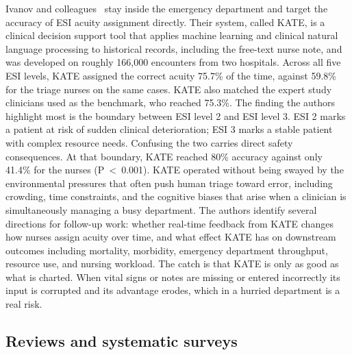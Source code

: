 \documentclass[11pt]{article}
\begin{document}
Ivanov and colleagues~\cite{Ivanov2021} stay inside the emergency department and target the accuracy of ESI acuity assignment directly. Their system, called KATE, is a clinical decision support tool that applies machine learning and clinical natural language processing to historical records, including the free-text nurse note, and was developed on roughly 166{,}000 encounters from two hospitals. Across all five ESI levels, KATE assigned the correct acuity 75.7\% of the time, against 59.8\% for the triage nurses on the same cases. KATE also matched the expert study clinicians used as the benchmark, who reached 75.3\%. The finding the authors highlight most is the boundary between ESI level 2 and ESI level 3. ESI 2 marks a patient at risk of sudden clinical deterioration; ESI 3 marks a stable patient with complex resource needs. Confusing the two carries direct safety consequences. At that boundary, KATE reached 80\% accuracy against only 41.4\% for the nurses (P~<~0.001). KATE operated without being swayed by the environmental pressures that often push human triage toward error, including crowding, time constraints, and the cognitive biases that arise when a clinician is simultaneously managing a busy department. The authors identify several directions for follow-up work: whether real-time feedback from KATE changes how nurses assign acuity over time, and what effect KATE has on downstream outcomes including mortality, morbidity, emergency department throughput, resource use, and nursing workload. The catch is that KATE is only as good as what is charted. When vital signs or notes are missing or entered incorrectly its input is corrupted and its advantage erodes, which in a hurried department is a real risk.

\subsection{Reviews and systematic surveys}
\end{document}
